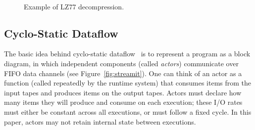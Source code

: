 \begin{figure}[t]
\begin{minipage}{0.21in}
\mbox{~}
\end{minipage}
\caption{Example of LZ77 decompression.
\protect\label{fig:lz77}}
\end{figure}

\subsection{Cyclo-Static Dataflow}

The basic idea behind cyclo-static
dataflow~\cite{bilsen95-cyclostatic,LM87-i} is to represent a program
as a block diagram, in which independent components (called {\it
  actors}) communicate over FIFO data channels (see
Figure~\ref{fig:streamit}).  One can think of an actor as a function
(called repeatedly by the runtime system) that consumes items from the
input tapes and produces items on the output tapes.  Actors must
declare how many items they will produce and consume on each
execution; these I/O rates must either be constant across all
executions, or must follow a fixed cycle.  In this paper, actors may
not retain internal state between executions.

